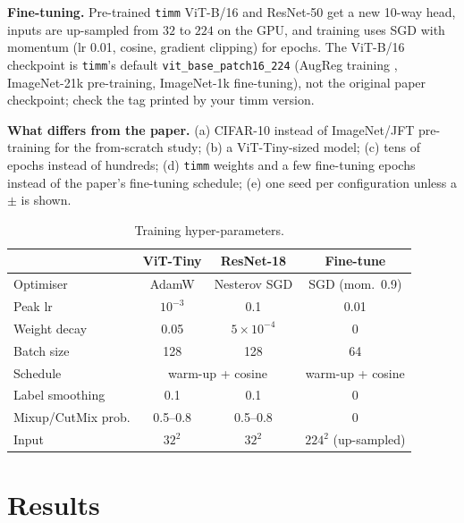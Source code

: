 \documentclass[conference]{IEEEtran}
\newif\ifdraft \drafttrue
\newcommand{\verify}[1]{\ifdraft{\color{red}#1}\else#1\fi}
\begin{document}
\textbf{Fine-tuning.} Pre-trained \texttt{timm} \cite{wightman2019} ViT-B/16 and ResNet-50 get a new 10-way head, inputs are up-sampled from $32$ to $224$ on the GPU, and training uses SGD with momentum (lr 0.01, cosine, gradient clipping) for \epochsFt{} epochs. \verify{The ViT-B/16 checkpoint is \texttt{timm}'s default \texttt{vit\_base\_patch16\_224} (AugReg training \cite{steiner2022}, ImageNet-21k pre-training, ImageNet-1k fine-tuning), not the original paper checkpoint; check the tag printed by your timm version.}

\textbf{What differs from the paper.} (a) CIFAR-10 instead of ImageNet/JFT pre-training for the from-scratch study; (b) a ViT-Tiny-sized model; (c) tens of epochs instead of hundreds; (d) \texttt{timm} weights and a few fine-tuning epochs instead of the paper's fine-tuning schedule; (e) one seed per configuration unless a $\pm$ is shown.

\begin{table}[t]
\centering\small
\caption{Training hyper-parameters.}
\label{tab:hp}
\begin{tabular}{@{}lccc@{}}
\toprule
 & ViT-Tiny & ResNet-18 & Fine-tune \\
\midrule
Optimiser & AdamW & Nesterov SGD & SGD (mom.\ 0.9) \\
Peak lr & $10^{-3}$ & 0.1 & 0.01 \\
Weight decay & 0.05 & $5{\times}10^{-4}$ & 0 \\
Batch size & 128 & 128 & 64 \\
Schedule & \multicolumn{2}{c}{warm-up + cosine} & warm-up + cosine \\
Label smoothing & 0.1 & 0.1 & 0 \\
Mixup/CutMix prob. & \verify{0.5--0.8} & \verify{0.5--0.8} & 0 \\
Input & $32^2$ & $32^2$ & $224^2$ (up-sampled) \\
\bottomrule
\end{tabular}
\end{table}

\section{Results}
\end{document}
